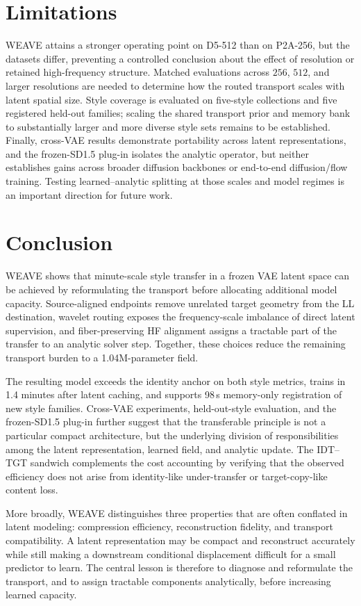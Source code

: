 \documentclass[letterpaper]{article} %
\begin{document}
\section{Limitations}

WEAVE attains a stronger operating point on D5-512 than on P2A-256,
but the datasets differ, preventing a controlled conclusion about the
effect of resolution or retained high-frequency structure.
Matched evaluations across $256$, $512$, and larger resolutions
are needed to determine how the routed transport scales with latent
spatial size. Style coverage is evaluated on five-style collections
and five registered held-out families; scaling the shared transport prior
and memory bank to substantially larger and more diverse style sets
remains to be established. Finally, cross-VAE results demonstrate
portability across latent representations, and the frozen-SD1.5 plug-in
isolates the analytic operator, but neither establishes gains across
broader diffusion backbones or end-to-end diffusion/flow training.
Testing learned--analytic splitting at those scales and model regimes is
an important direction for future work.

\section{Conclusion}

WEAVE shows that minute-scale style transfer in a frozen VAE latent
space can be achieved by reformulating the transport before allocating
additional model capacity. Source-aligned endpoints remove unrelated
target geometry from the LL destination, wavelet routing exposes the
frequency-scale imbalance of direct latent supervision, and
fiber-preserving HF alignment assigns a tractable part of the transfer
to an analytic solver step. Together, these choices reduce the remaining
transport burden to a 1.04M-parameter field.

The resulting model exceeds the identity anchor on both style metrics,
trains in 1.4 minutes after latent caching, and supports 98\,s
memory-only registration of new style families. Cross-VAE experiments, held-out-style evaluation, and the
frozen-SD1.5 plug-in further suggest that the transferable principle is
not a particular compact architecture, but the underlying division of
responsibilities among the latent representation, learned field, and
analytic update. The IDT--TGT sandwich complements the cost accounting
by verifying that the observed efficiency does not arise from
identity-like under-transfer or target-copy-like content loss.

More broadly, WEAVE distinguishes three properties that are often
conflated in latent modeling: compression efficiency, reconstruction
fidelity, and transport compatibility. A latent representation may be
compact and reconstruct accurately while still making a downstream
conditional displacement difficult for a small predictor to learn.
The central lesson is therefore to diagnose and reformulate the
transport, and to assign tractable components analytically, before
increasing learned capacity.


\end{document}
